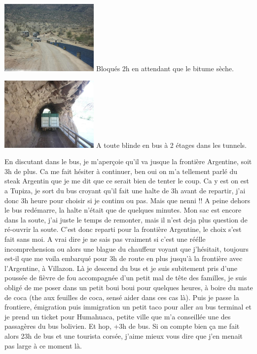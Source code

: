 \begin{multicols}{2}
\hspace*{-0.65cm}
\includegraphics[width=4.8cm]{articles/La-paz-humahuaca-et-salaar/1257387196swjJ.jpg}
Bloqués 2h en attendant que le bitume sèche.

\hspace*{-0.65cm}
\includegraphics[width=4.8cm]{articles/La-paz-humahuaca-et-salaar/1257387183J7sM.jpg}
A toute blinde en bus à 2 étages dans les tunnels.

En discutant dans le bus, je m'aperçoie qu'il va jusque la frontière Argentine, soit 3h de plus. Ca me fait hésiter à continuer, ben oui on m'a tellement parlé du steak Argentin que je me dit que ce serait bien de tenter le coup. Ca y est on est a Tupiza, je sort du bus croyant qu'il fait une halte de 3h avant de repartir, j'ai donc 3h heure pour choisir si je continu ou pas. Mais que nenni !! A peine dehors le bus redémarre, la halte n'était que de quelques minutes. Mon sac est encore dans la soute, j'ai juste le temps de remonter, mais il n'est deja plus question de ré-ouvrir la soute. C'est donc reparti pour la frontière Argentine, le choix s'est fait sans moi. A vrai dire je ne sais pas vraiment si c'est une réélle incomprehension ou alors une blague du chauffeur voyant que j'hésitait, toujours est-il que me voila embarqué pour 3h de route en plus jusqu'à la frontière avec l'Argentine, à Villazon. Là je descend du bus et je suis subitement pris d'une poussée de fièvre de fou accompagnée d'un petit mal de tête des familles, je suis obligé de me poser dans un petit boui boui pour quelques heures, à boire du mate de coca (the aux feuilles de coca, sensé aider dans ces cas là). Puis je passe la frontiere, émigration puis immigration un petit taco pour aller au bus terminal et je prend un ticket pour Humahuaca, petite ville que m'a conseillée une des passagères du bus bolivien. Et hop, +3h de bus. Si on compte bien ça me fait alors 23h de bus et une tourista corsée, j'aime mieux vous dire que j'en menait pas large à ce moment là.


\end{multicols}

